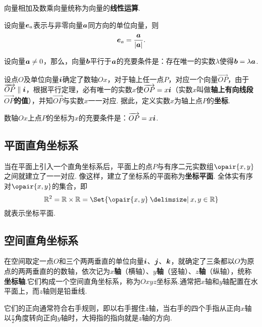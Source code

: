 \begin{definition}
向量相加及数乘向量统称为向量的\textbf{线性运算}.
\end{definition}

\begin{theorem}
设向量\(\boldsymbol{e}_a\)表示与非零向量\(\boldsymbol{a}\)同方向的单位向量，则\[
\boldsymbol{e}_a=\frac{\boldsymbol{a}}{\abs{\boldsymbol{a}}}.
\]
\end{theorem}

\begin{theorem}[平行定理]
设向量\(\boldsymbol{a} \neq 0\)，那么，向量\(\boldsymbol{b}\)平行于\(\boldsymbol{a}\)的充要条件是：存在唯一的实数\(\lambda\)使得\(\boldsymbol{b}=\lambda\boldsymbol{a}\).
\end{theorem}

\begin{definition}
设点\(O\)及单位向量\(\boldsymbol{i}\)确定了数轴\(Ox\)，对于轴上任一点\(P\)，对应一个向量\(\vec{OP}\)，由于\(\overrightarrow{OP}\parallel\boldsymbol{i}\)，根据平行定理，必有唯一的实数\(x\)使\(\overrightarrow{OP}=x\boldsymbol{i}\)（实数\(x\)叫做\textbf{轴上有向线段\(\vec{OP}\)的值}），并知\(\vec{OP}\)与实数\(x\)一一对应.
据此，定义实数\(x\)为轴上点\(P\)的\textbf{坐标}.
\end{definition}

\begin{theorem}
数轴\(Ox\)上点\(P\)的坐标为\(x\)的充要条件是：\(\overrightarrow{OP}=x\boldsymbol{i}\).
\end{theorem}

\subsection{平面直角坐标系}
当在平面上引入一个直角坐标系后，平面上的点\(P\)与有序二元实数组\(\opair{x,y}\)之间就建立了一一对应.
像这样，建立了坐标系的平面称为\textbf{坐标平面}.
全体实有序对\(\opair{x,y}\)的集合，即\[
\mathbb{R}^2=\mathbb{R}\times\mathbb{R}=\Set{\opair{x,y} \given x,y\in\mathbb{R}}
\]就表示坐标平面.

\subsection{空间直角坐标系}
在空间取定一点\(O\)和三个两两垂直的单位向量\(\boldsymbol{i}\)、\(\boldsymbol{j}\)、\(\boldsymbol{k}\)，就确定了三条都以\(O\)为原点的两两垂直的的数轴，依次记为\textbf{\(x\)轴}（横轴）、\textbf{\(y\)轴}（竖轴）、\textbf{\(z\)轴}（纵轴），统称\textbf{坐标轴}.它们构成一个空间直角坐标系，称为\(Oxyz\)坐标系.通常把\(x\)轴和\(y\)轴配置在水平面上，而\(z\)轴则是铅垂线.

它们的正向通常符合右手规则，即以右手握住\(z\)轴，当右手的四个手指从正向\(x\)轴以\(\frac{\pi}{2}\)角度转向正向\(y\)轴时，大拇指的指向就是\(z\)轴的方向.

